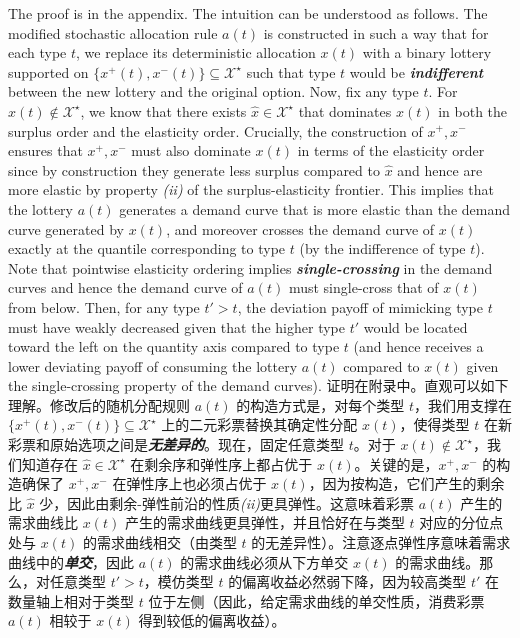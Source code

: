 \documentclass[12pt,letterpaper]{article}
\newenvironment{original}{\color{black}\noindent}{}
\newenvironment{translation}{\color{blue}\noindent}{}
\theoremstyle{plain}
\theoremstyle{definition}
\theoremstyle{remark}
\renewcommand{\1}{\mathds{1}}
\newcommand{\X}{\mathcal{X}}
\theoremstyle{definition}
\begin{document}
\begin{original}
The proof is in the appendix. The intuition can be understood as follows. The modified stochastic allocation rule $a(t)$ is constructed in such a way that for each type $t$, we replace its deterministic allocation $x(t)$ with a binary lottery supported on $\{x^{+}(t), x^{-}(t)\} \subseteq \mathcal{X}^\star$ such that type $t$ would be  \textit{\textbf{indifferent}} between the new lottery and the original option. Now, fix any type $t$. For $x(t) \not\in \X^\star$, we know that there exists $\hat{x} \in \X^\star$ that dominates $x(t)$ in both the surplus order and the elasticity order. Crucially, the construction of $x^+, x^-$ ensures that $x^+, x^-$ must also dominate $x(t)$ in terms of the elasticity order since by construction they generate less surplus compared to $\hat{x}$ and hence are more elastic by property \textit{(ii)} of the surplus-elasticity frontier. This implies that the lottery $a(t)$ generates a demand curve that is more elastic than the demand curve generated by $x(t)$, and moreover crosses the demand curve of $x(t)$ exactly at the quantile corresponding to type $t$ (by the indifference of type $t$). Note that pointwise elasticity ordering implies \textit{\textbf{single-crossing}} in the demand curves and hence the demand curve of $a(t)$ must single-cross that of $x(t)$ from below. Then, for any type $t' > t$, the deviation payoff of mimicking type $t$ must have weakly decreased given that the higher type $t'$ would be located toward the left on the quantity axis compared to type $t$ (and hence receives a lower deviating payoff of consuming the lottery $a(t)$ compared to $x(t)$ given the single-crossing property of the demand curves).
\end{original}
\begin{translation}
证明在附录中。直观可以如下理解。修改后的随机分配规则 $a(t)$ 的构造方式是，对每个类型 $t$，我们用支撑在 $\{x^{+}(t), x^{-}(t)\} \subseteq \mathcal{X}^\star$ 上的二元彩票替换其确定性分配 $x(t)$，使得类型 $t$ 在新彩票和原始选项之间是\textit{\textbf{无差异的}}。现在，固定任意类型 $t$。对于 $x(t) \not\in \X^\star$，我们知道存在 $\hat{x} \in \X^\star$ 在剩余序和弹性序上都占优于 $x(t)$。关键的是，$x^+, x^-$ 的构造确保了 $x^+, x^-$ 在弹性序上也必须占优于 $x(t)$，因为按构造，它们产生的剩余比 $\hat{x}$ 少，因此由剩余-弹性前沿的性质\textit{(ii)}更具弹性。这意味着彩票 $a(t)$ 产生的需求曲线比 $x(t)$ 产生的需求曲线更具弹性，并且恰好在与类型 $t$ 对应的分位点处与 $x(t)$ 的需求曲线相交（由类型 $t$ 的无差异性）。注意逐点弹性序意味着需求曲线中的\textit{\textbf{单交}}，因此 $a(t)$ 的需求曲线必须从下方单交 $x(t)$ 的需求曲线。那么，对任意类型 $t' > t$，模仿类型 $t$ 的偏离收益必然弱下降，因为较高类型 $t'$ 在数量轴上相对于类型 $t$ 位于左侧（因此，给定需求曲线的单交性质，消费彩票 $a(t)$ 相较于 $x(t)$ 得到较低的偏离收益）。
\end{translation}
\end{document}
